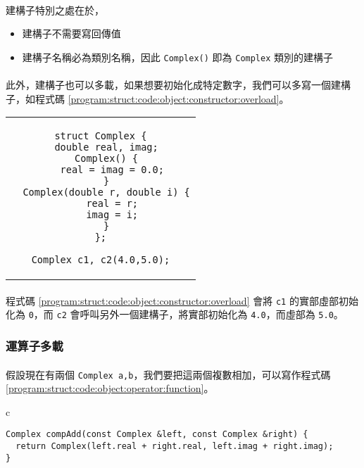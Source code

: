 \documentclass[12pt,a4paper,oneside]{report}
\begin{document}
\begin{CJK}{UTF8}{bkai}
\paragraph{}建構子特別之處在於，
\begin{itemize}
\item 建構子不需要寫回傳值
\item 建構子名稱必為類別名稱，因此 \lstinline!Complex()! 即為 \lstinline!Complex! 類別的建構子
\end{itemize}

\paragraph{}此外，建構子也可以多載，如果想要初始化成特定數字，我們可以多寫一個建構子，如程式碼 \ref{program:struct:code:object:constructor:overload}。

\begin{code}[h!]
\centering
\begin{tabular}{c}
\begin{lstlisting}
struct Complex {
  double real, imag;
  Complex() {
    real = imag = 0.0;
  }
  Complex(double r, double i) {
    real = r;
    imag = i;
  }
};

Complex c1, c2(4.0,5.0);
\end{lstlisting}
\end{tabular}
\caption{\lstinline!Complex! 建構子多載}
\label{program:struct:code:object:constructor:overload}
\end{code}

\paragraph{}程式碼 \ref{program:struct:code:object:constructor:overload} 會將 \lstinline!c1! 的實部虛部初始化為 \lstinline!0!，而 \lstinline!c2! 會呼叫另外一個建構子，將實部初始化為 \lstinline!4.0!，而虛部為 \lstinline!5.0!。

\subsubsection{運算子多載}

\paragraph{}假設現在有兩個 \lstinline!Complex a,b!，我們要把這兩個複數相加，可以寫作程式碼 \ref{program:struct:code:object:operator:function}。

\begin{code}[h!]
\centering
\begin{tabular}{c}
\begin{lstlisting}
Complex compAdd(const Complex &left, const Complex &right) {
  return Complex(left.real + right.real, left.imag + right.imag);
}


\end{lstlisting}
\end{tabular}
\end{code}
\end{CJK}
\end{document}
